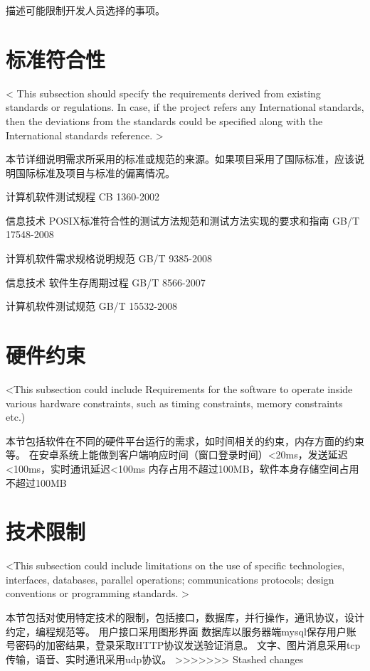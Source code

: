 描述可能限制开发人员选择的事项。
\if
\section{标准符合性}
\iffalse
< This subsection should specify the requirements derived from existing standards or regulations. In case, if the project refers any International standards, then the deviations from the standards could be specified along with the International standards reference. >

本节详细说明需求所采用的标准或规范的来源。如果项目采用了国际标准，应该说明国际标准及项目与标准的偏离情况。
\if
\item 计算机软件测试规程  CB 1360-2002
\item 信息技术 POSIX标准符合性的测试方法规范和测试方法实现的要求和指南  GB/T 17548-2008 
\item 计算机软件需求规格说明规范   GB/T 9385-2008 
\item 信息技术 软件生存周期过程  GB/T 8566-2007 
\item 计算机软件测试规范   GB/T 15532-2008  

\section{硬件约束}
\iffalse
<This subsection could include Requirements for the software to operate inside various hardware constraints, such as timing constraints, memory constraints etc.)

本节包括软件在不同的硬件平台运行的需求，如时间相关的约束，内存方面的约束等。
\if
在安卓系统上能做到客户端响应时间（窗口登录时间）<20ms，发送延迟<100ms，实时通讯延迟<100ms
内存占用不超过100MB，软件本身存储空间占用不超过100MB

\section{技术限制}
\iffalse
<This subsection could include limitations on the use of specific technologies, interfaces, databases, parallel operations; communications protocols; design conventions or programming standards. >

本节包括对使用特定技术的限制，包括接口，数据库，并行操作，通讯协议，设计约定，编程规范等。
\if
用户接口采用图形界面
数据库以服务器端mysql保存用户账号密码的加密结果，登录采取HTTP协议发送验证消息。
文字、图片消息采用tcp传输，语音、实时通讯采用udp协议。
>>>>>>> Stashed changes
